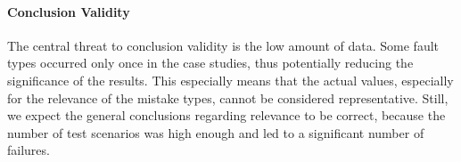 
\paragraph{Conclusion Validity}
The central threat to conclusion validity is the low amount of data.
Some fault types occurred only once in the case studies, thus potentially reducing the significance of the results.
This especially means that the actual values, especially for the relevance of the mistake types, cannot be considered representative.
Still, we expect the general conclusions regarding relevance to be correct, because the number of test scenarios was high enough and led to a significant number of failures.


